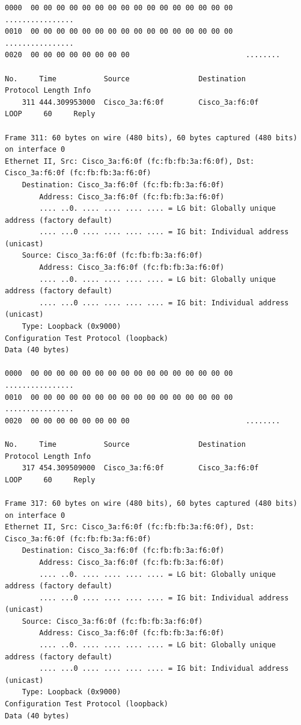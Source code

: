 \documentclass[a4paper,11pt]{article}
\begin{document}
\begin{lstlisting}
0000  00 00 00 00 00 00 00 00 00 00 00 00 00 00 00 00   ................
0010  00 00 00 00 00 00 00 00 00 00 00 00 00 00 00 00   ................
0020  00 00 00 00 00 00 00 00                           ........

No.     Time           Source                Destination           Protocol Length Info
    311 444.309953000  Cisco_3a:f6:0f        Cisco_3a:f6:0f        LOOP     60     Reply

Frame 311: 60 bytes on wire (480 bits), 60 bytes captured (480 bits) on interface 0
Ethernet II, Src: Cisco_3a:f6:0f (fc:fb:fb:3a:f6:0f), Dst: Cisco_3a:f6:0f (fc:fb:fb:3a:f6:0f)
    Destination: Cisco_3a:f6:0f (fc:fb:fb:3a:f6:0f)
        Address: Cisco_3a:f6:0f (fc:fb:fb:3a:f6:0f)
        .... ..0. .... .... .... .... = LG bit: Globally unique address (factory default)
        .... ...0 .... .... .... .... = IG bit: Individual address (unicast)
    Source: Cisco_3a:f6:0f (fc:fb:fb:3a:f6:0f)
        Address: Cisco_3a:f6:0f (fc:fb:fb:3a:f6:0f)
        .... ..0. .... .... .... .... = LG bit: Globally unique address (factory default)
        .... ...0 .... .... .... .... = IG bit: Individual address (unicast)
    Type: Loopback (0x9000)
Configuration Test Protocol (loopback)
Data (40 bytes)

0000  00 00 00 00 00 00 00 00 00 00 00 00 00 00 00 00   ................
0010  00 00 00 00 00 00 00 00 00 00 00 00 00 00 00 00   ................
0020  00 00 00 00 00 00 00 00                           ........

No.     Time           Source                Destination           Protocol Length Info
    317 454.309509000  Cisco_3a:f6:0f        Cisco_3a:f6:0f        LOOP     60     Reply

Frame 317: 60 bytes on wire (480 bits), 60 bytes captured (480 bits) on interface 0
Ethernet II, Src: Cisco_3a:f6:0f (fc:fb:fb:3a:f6:0f), Dst: Cisco_3a:f6:0f (fc:fb:fb:3a:f6:0f)
    Destination: Cisco_3a:f6:0f (fc:fb:fb:3a:f6:0f)
        Address: Cisco_3a:f6:0f (fc:fb:fb:3a:f6:0f)
        .... ..0. .... .... .... .... = LG bit: Globally unique address (factory default)
        .... ...0 .... .... .... .... = IG bit: Individual address (unicast)
    Source: Cisco_3a:f6:0f (fc:fb:fb:3a:f6:0f)
        Address: Cisco_3a:f6:0f (fc:fb:fb:3a:f6:0f)
        .... ..0. .... .... .... .... = LG bit: Globally unique address (factory default)
        .... ...0 .... .... .... .... = IG bit: Individual address (unicast)
    Type: Loopback (0x9000)
Configuration Test Protocol (loopback)
Data (40 bytes)


\end{lstlisting}
\end{document}
